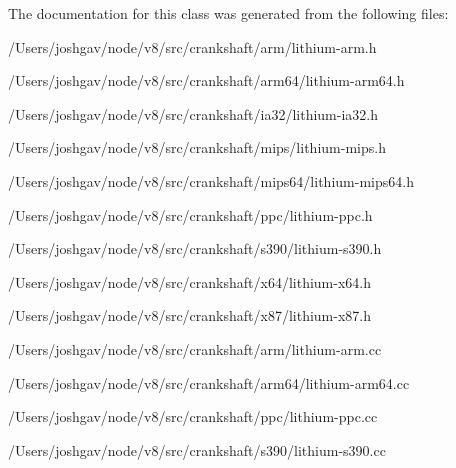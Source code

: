 The documentation for this class was generated from the following files\+:\begin{DoxyCompactItemize}
\item 
/\+Users/joshgav/node/v8/src/crankshaft/arm/lithium-\/arm.\+h\item 
/\+Users/joshgav/node/v8/src/crankshaft/arm64/lithium-\/arm64.\+h\item 
/\+Users/joshgav/node/v8/src/crankshaft/ia32/lithium-\/ia32.\+h\item 
/\+Users/joshgav/node/v8/src/crankshaft/mips/lithium-\/mips.\+h\item 
/\+Users/joshgav/node/v8/src/crankshaft/mips64/lithium-\/mips64.\+h\item 
/\+Users/joshgav/node/v8/src/crankshaft/ppc/lithium-\/ppc.\+h\item 
/\+Users/joshgav/node/v8/src/crankshaft/s390/lithium-\/s390.\+h\item 
/\+Users/joshgav/node/v8/src/crankshaft/x64/lithium-\/x64.\+h\item 
/\+Users/joshgav/node/v8/src/crankshaft/x87/lithium-\/x87.\+h\item 
/\+Users/joshgav/node/v8/src/crankshaft/arm/lithium-\/arm.\+cc\item 
/\+Users/joshgav/node/v8/src/crankshaft/arm64/lithium-\/arm64.\+cc\item 
/\+Users/joshgav/node/v8/src/crankshaft/ppc/lithium-\/ppc.\+cc\item 
/\+Users/joshgav/node/v8/src/crankshaft/s390/lithium-\/s390.\+cc\end{DoxyCompactItemize}
